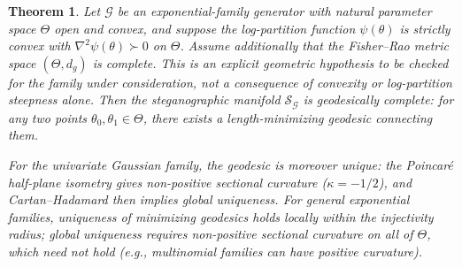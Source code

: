 \documentclass[a4paper,fleqn]{cas-dc}
\newtheorem{theorem}{Theorem}
\newcommand{\calS}{\mathcal{S}}
\newcommand{\calG}{\mathcal{G}}
\begin{document}
\begin{theorem}%
  \label{thm:completeness}
  Let $\calG$ be an exponential-family generator with natural parameter
  space $\Theta$ open and convex, and suppose the log-partition function
  $\psi(\theta)$ is strictly convex with $\nabla^2\psi(\theta) \succ 0$
  on $\Theta$. Assume additionally that the Fisher--Rao metric
  space $(\Theta,d_g)$ is complete. This is an explicit geometric
  hypothesis to be checked for the family under consideration, not a
  consequence of convexity or log-partition steepness alone.
  Then the steganographic manifold $\calS_{\calG}$ is geodesically
  complete: for any two points $\theta_0, \theta_1 \in \Theta$, there
  exists a length-minimizing geodesic connecting them.

  For the univariate Gaussian family, the geodesic is moreover \emph{unique}:
  the Poincar\'{e} half-plane isometry gives non-positive sectional curvature
  ($\kappa = -1/2$), and Cartan--Hadamard then implies global uniqueness.
  For general exponential families, uniqueness of minimizing geodesics holds
  locally within the injectivity radius; global uniqueness requires
  non-positive sectional curvature on all of $\Theta$, which need not hold
  (e.g., multinomial families can have positive curvature).
\end{theorem}
\end{document}
